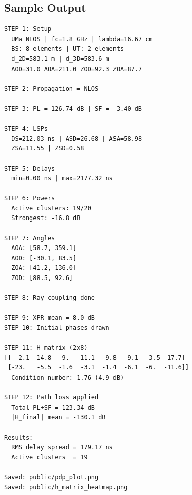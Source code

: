 \documentclass[10pt,a4paper,twocolumn]{article}
\begin{document}
\subsection*{Sample Output}

\begin{lstlisting}[style=outputstyle]
STEP 1: Setup
  UMa NLOS | fc=1.8 GHz | lambda=16.67 cm
  BS: 8 elements | UT: 2 elements
  d_2D=583.1 m | d_3D=583.6 m
  AOD=31.0 AOA=211.0 ZOD=92.3 ZOA=87.7

STEP 2: Propagation = NLOS

STEP 3: PL = 126.74 dB | SF = -3.40 dB

STEP 4: LSPs
  DS=212.03 ns | ASD=26.68 | ASA=58.98
  ZSA=11.55 | ZSD=0.58

STEP 5: Delays
  min=0.00 ns | max=2177.32 ns

STEP 6: Powers
  Active clusters: 19/20
  Strongest: -16.8 dB

STEP 7: Angles
  AOA: [58.7, 359.1]
  AOD: [-30.1, 83.5]
  ZOA: [41.2, 136.0]
  ZOD: [88.5, 92.6]

STEP 8: Ray coupling done

STEP 9: XPR mean = 8.0 dB
STEP 10: Initial phases drawn

STEP 11: H matrix (2x8)
[[ -2.1 -14.8  -9.  -11.1  -9.8  -9.1  -3.5 -17.7]
 [-23.   -5.5  -1.6  -3.1  -1.4  -6.1  -6.  -11.6]]
  Condition number: 1.76 (4.9 dB)

STEP 12: Path loss applied
  Total PL+SF = 123.34 dB
  |H_final| mean = -130.1 dB

Results:
  RMS delay spread = 179.17 ns
  Active clusters  = 19

Saved: public/pdp_plot.png
Saved: public/h_matrix_heatmap.png
\end{lstlisting}



\end{document}
